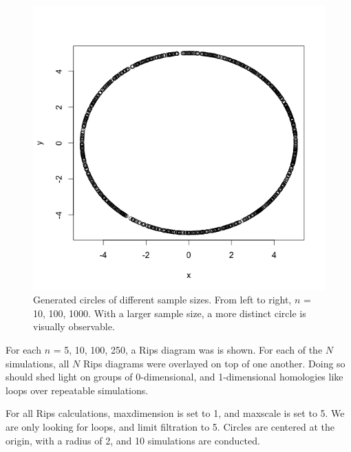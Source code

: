 \documentclass[12pt]{article}
\begin{document}
\begin{figure}[!htb]
    \includegraphics[width=0.85\linewidth]{circle1000.png}
  \endminipage\hfill
  \caption{Generated circles of different sample sizes. From left to right, $n$ = 10, 100, 1000. With a larger sample size, a more distinct circle is visually observable.}
\end{figure}

For each $n$ = 5, 10, 100, 250, a Rips diagram was is shown. For each of the $N$ simulations, all $N$ Rips diagrams were overlayed on top of one another. Doing so should shed light on groups of 0-dimensional, and 1-dimensional homologies like loops over repeatable simulations. 

For all Rips calculations, maxdimension is set to 1, and maxscale is set to 5. We are only looking for loops, and limit filtration to 5. Circles are centered at the origin, with a radius of 2, and 10 simulations are conducted. 
\end{document}
